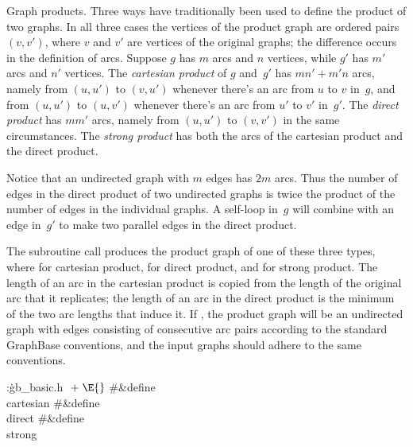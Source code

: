 Graph products. Three ways have traditionally been used to define the
product of two graphs. In all three cases the vertices of the product graph
are ordered pairs $(v,v')$, where $v$ and $v'$ are vertices of the original
graphs; the difference occurs in the definition of arcs. Suppose $g$ has
$m$ arcs and $n$ vertices, while $g'$ has $m'$ arcs and $n'$ vertices. The
{\sl cartesian product\/} of $g$ and~$g'$ has $mn'+m'n$ arcs, namely from
$(u,u')$ to $(v,u')$ whenever there's an arc from $u$ to $v$ in~$g$, and from
$(u,u')$ to $(u,v')$ whenever there's an arc from $u'$ to $v'$ in~$g'$.
The {\sl direct product\/} has $mm'$ arcs, namely from $(u,u')$ to
$(v,v')$ in the same circumstances. The {\sl strong product\/}
has both the arcs of the cartesian product and the direct product.

Notice that an undirected graph with $m$ edges has $2m$ arcs. Thus the
number of edges in the direct product of two undirected graphs is
twice the product of the number of edges in the individual graphs.
A self-loop in~$g$ will combine with an edge in~$g'$ to make
two parallel edges in the direct product.

The subroutine call 
produces the product
graph of one of these three types, where  for cartesian
product,
 for direct product, and  for
strong product.
The length of an arc in the cartesian product is copied from the length
of the original arc that it replicates; the length of an arc in the direct
product is the minimum of the two arc lengths that induce it. If ,
the product graph will be an undirected graph with edges consisting
of consecutive arc pairs according to the standard GraphBase conventions,
and the input graphs should adhere to  the same conventions.

\Y\B\4:\.{gb\_basic.h }\X${}\mathrel+\E{}$\6
\8\#\&{define} \\{cartesian}\5\6
\8\#\&{define} \\{direct}\5\6
\8\#\&{define} \\{strong}\5\par
\fi

